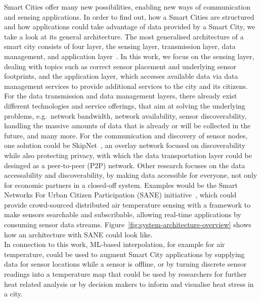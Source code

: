 Smart Cities offer many new possibilities, enabling new ways of communication and sensing applications. In order to find out, how a Smart Cities are structured and how applications could take advantage of data provided by a Smart City, we take a look at its general architecture.
The most generalised architecture of a smart city consists of four layer, the sensing layer, transmission layer, data management, and application layer~\cite{silva2018towards}. In this work, we focus on the sensing layer, dealing with topics such as correct sensor placement and underlying sensor footprints, and the application layer, which accesses available data via data management services to provide additional services to the city and its citizens. For the data transmission and data management layers, there already exist different technologies and service offerings, that aim at solving the underlying problems, e.g.\ network bandwidth, network availability, sensor discoverability, handling the massive amounts of data that is already or will be collected in the future, and many more. For the communication and discovery of sensor nodes, one solution could be SkipNet~\cite{harvey2002skipnet}, an overlay network focused on discoverability while also protecting privacy, with which the data transportation layer could be desinged as a peer-to-peer (P2P) network. Other research focuses on the data accessability and discoverability, by making data accessible for everyone, not only for economic partners in a closed-off system. Examples would be the Smart Networks For Urban Citizen Participation (SANE) initiative~\cite{bornholdt2019sane}, which could provide crowd-sourced distributed air temperature sensing with a framework to make sensors searchable and subscribable, allowing real-time applications by consuming sensor data streams. Figure~\ref{fig:system-architecture-overview} shows how an architecture with SANE could look like.\\
In connection to this work, ML-based interpolation, for example for air temperature, could be used to augment Smart City applications by supplying data for sensor locations while a sensor is offline, or by turning discrete sensor readings into a temperature map that could be used by researchers for further heat related analysis or by decision makers to inform and visualise heat stress in a city.\\

